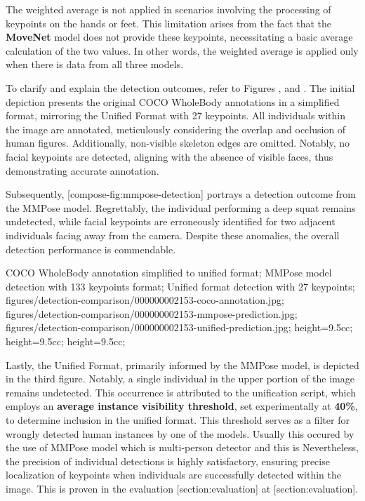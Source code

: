 
The weighted average is not applied in scenarios involving the processing of keypoints on the hands or feet. This limitation arises from the fact that the {\bf MoveNet} model does not provide these keypoints, necessitating a basic average calculation of the two values. In other words, the weighted average is applied only when there is data from all three models.

To clarify and explain the detection outcomes, refer to Figures ,  and . The initial depiction presents the original COCO WholeBody annotations in a simplified format, mirroring the Unified Format with 27 keypoints. All individuals within the image are annotated, meticulously considering the overlap and occlusion of human figures. Additionally, non-visible skeleton edges are omitted. Notably, no facial keypoints are detected, aligning with the absence of visible faces, thus demonstrating accurate annotation.

Subsequently, [compose-fig:mmpose-detection] portrays a detection outcome from the MMPose model. Regrettably, the individual performing a deep squat remains undetected, while facial keypoints are erroneously identified for two adjacent individuals facing away from the camera. Despite these anomalies, the overall detection performance is commendable.

    {
        COCO WholeBody annotation simplified to unified format;
        MMPose model detection with 133 keypoints format;
        Unified format detection with 27 keypoints;
    }
    {
        figures/detection-comparison/000000002153-coco-annotation.jpg;
        figures/detection-comparison/000000002153-mmpose-prediction.jpg;
        figures/detection-comparison/000000002153-unified-prediction.jpg;
    }
    {
        height=9.5cc;
        height=9.5cc;
        height=9.5cc;
    }

Lastly, the Unified Format, primarily informed by the MMPose model, is depicted in the third figure. Notably, a single individual in the upper portion of the image remains undetected. This occurrence is attributed to the unification script, which employs an {\bf average instance visibility threshold}, set experimentally at {\bf 40\%}, to determine inclusion in the unified format. This threshold serves as a filter for wrongly detected human instances by one of the models. Usually this occured by the use of MMPose model which is multi-person detector and this is Nevertheless, the precision of individual detections is highly satisfactory, ensuring precise localization of keypoints when individuals are successfully detected within the image. This is proven in the evaluation [section:evaluation] at [section:evaluation].

